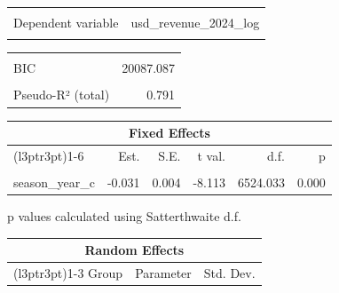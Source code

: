 \documentclass[
  12pt]{article}
\begin{document}
\begin{table}[!h]
\centering
\begin{tabular}{lr}
\toprule
\cellcolor{gray!10}{Observations} & \cellcolor{gray!10}{7023}\\
Dependent variable & usd\_revenue\_2024\_log\\
\cellcolor{gray!10}{Type} & \cellcolor{gray!10}{Mixed effects linear regression}\\
\bottomrule
\end{tabular}
\end{table} \begin{table}[!h]
\centering
\begin{tabular}{lr}
\toprule
\cellcolor{gray!10}{AIC} & \cellcolor{gray!10}{20052.802}\\
BIC & 20087.087\\
\cellcolor{gray!10}{Pseudo-R² (fixed effects)} & \cellcolor{gray!10}{0.005}\\
Pseudo-R² (total) & 0.791\\
\bottomrule
\end{tabular}
\end{table} \begin{table}[!h]
\centering
\begin{threeparttable}
\begin{tabular}{lrrrrr}
\toprule
\multicolumn{6}{c}{Fixed Effects} \\
\cmidrule(l{3pt}r{3pt}){1-6}
  & Est. & S.E. & t val. & d.f. & p\\
\midrule
\cellcolor{gray!10}{(Intercept)} & \cellcolor{gray!10}{15.991} & \cellcolor{gray!10}{0.072} & \cellcolor{gray!10}{221.312} & \cellcolor{gray!10}{32.906} & \cellcolor{gray!10}{0.000}\\
season\_year\_c & -0.031 & 0.004 & -8.113 & 6524.033 & 0.000\\
\bottomrule
\end{tabular}
\begin{tablenotes}
\item  p values calculated using Satterthwaite d.f. 
\end{tablenotes}
\end{threeparttable}
\end{table} \begin{table}[!h]
\centering
\begin{tabular}{lll}
\toprule
\multicolumn{3}{c}{Random Effects} \\
\cmidrule(l{3pt}r{3pt}){1-3}
Group & Parameter & Std. Dev.\\

\end{tabular}
\end{table}
\end{document}
